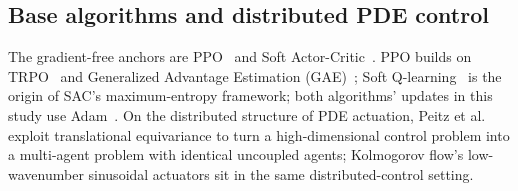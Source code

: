 \subsection{Base algorithms and distributed PDE control}
The gradient-free anchors are PPO~\cite{ppo2017} and Soft
Actor-Critic~\cite{sac2018,sacapps2018}. PPO builds on TRPO~\cite{trpo2015}
and Generalized Advantage Estimation (GAE)~\cite{gae2015}; Soft
Q-learning~\cite{softq2017} is the origin of SAC's maximum-entropy
framework; both algorithms' updates in this study use
Adam~\cite{kingma2015adam}. On the distributed structure of PDE actuation, Peitz et
al.~\cite{peitz2024} exploit translational equivariance to turn a
high-dimensional control problem into a multi-agent problem with identical
uncoupled agents; Kolmogorov flow's low-wavenumber sinusoidal actuators sit
in the same distributed-control setting.
